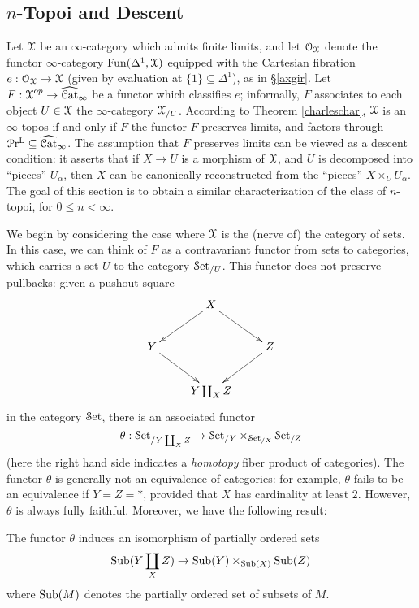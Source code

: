 \subsection{$n$-Topoi and Descent}\label{provengiraudeasy}

Let $\operatorname{\mathcal{X}}$ be an $\infty$-category which admits finite limits, and let
$\operatorname{\mathcal{O}}_{\operatorname{\mathcal{X}}}$ denote the functor $\infty$-category $\operatorname{Fun}(\Delta^1, \operatorname{\mathcal{X}})$ equipped
with the Cartesian fibration $e: \operatorname{\mathcal{O}}_{\operatorname{\mathcal{X}}} \rightarrow \operatorname{\mathcal{X}}$ (given by evaluation
at $\{1\} \subseteq \Delta^1$), as in \S \ref{axgir}. Let $F: \operatorname{\mathcal{X}}^{op} \rightarrow \widehat{\operatorname{\mathcal{C}at}}_{\infty}$ be a functor which classifies $e$; informally, $F$ associates to each object $U \in \operatorname{\mathcal{X}}$ the $\infty$-category $\operatorname{\mathcal{X}}_{/U}$. According to Theorem \ref{charleschar}, 
$\operatorname{\mathcal{X}}$ is an $\infty$-topos if and only if $F$ the functor
$F$ preserves limits, and factors through $\operatorname{\mathcal{P}r^{L}} \subseteq \widehat{\operatorname{\mathcal{C}at}}_{\infty}$.
The assumption that $F$ preserves limits can be viewed as a descent condition: it asserts that if $X \rightarrow U$ is a morphism of $\operatorname{\mathcal{X}}$, and $U$ is decomposed into ``pieces'' $U_{\alpha}$, then $X$ can be canonically reconstructed from the ``pieces'' $X \times_{U} U_{\alpha}$.
The goal of this section is to obtain a similar characterization of the class of $n$-topoi, for $0 \leq n < \infty$. 

We begin by considering the case where $\operatorname{\mathcal{X}}$ is the (nerve of) the category of sets. In this case, we can think of $F$ as a contravariant functor from sets to categories,
which carries a set $U$ to the category $\operatorname{\mathcal{S}et}_{/U}$. This functor does not preserve pullbacks: given a pushout square $$ \xymatrix{ & X \ar[dl] \ar[dr] &  \\
Y \ar[dr] & & Z \ar[dl] \\
& Y \amalg_{X} Z & }$$
in the category $\operatorname{\mathcal{S}et}$, there is an associated functor
$$ \theta: \operatorname{\mathcal{S}et}_{/ Y \coprod_{X} Z} \rightarrow \operatorname{\mathcal{S}et}_{/Y} \times_{ \operatorname{\mathcal{S}et}_{/X} } \operatorname{\mathcal{S}et}_{/Z}$$
(here the right hand side indicates a {\em homotopy} fiber product of categories). The functor $\theta$ is generally not an equivalence of categories: for example, $\theta$ fails to be an 
equivalence if $Y = Z = \ast$, provided that $X$ has cardinality at least $2$. However, $\theta$ is always fully faithful. Moreover, we have the following result:

\begin{fact}\label{stiro}
The functor $\theta$ induces an isomorphism of partially ordered sets
$$ \operatorname{Sub}(Y \coprod_{X} Z) \rightarrow \operatorname{Sub}(Y) \times_{ \operatorname{Sub}(X) } \operatorname{Sub}(Z)$$
where $\operatorname{Sub}(M)$ denotes the partially ordered set of subsets of $M$.
\end{fact}

